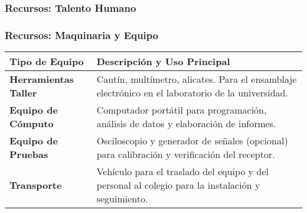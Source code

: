 \begin{frame}
  \frametitle{Recursos: Talento Humano}

\end{frame}

\begin{frame}
  \frametitle{Recursos: Maquinaria y Equipo}

  \begin{tabularx}{\textwidth}{lX}
    \toprule
    \textbf{Tipo de Equipo} & \textbf{Descripción y Uso Principal} \\
    \midrule
    \textbf{Herramientas Taller} & 
    Cautín, multímetro, alicates. Para el ensamblaje electrónico en el 
    laboratorio de la universidad. \\
    \addlinespace
    \textbf{Equipo de Cómputo} & 
    Computador portátil para programación, análisis de datos y elaboración 
    de informes. \\
    \addlinespace
    \textbf{Equipo de Pruebas} & 
    Osciloscopio y generador de señales (opcional) para calibración y 
    verificación del receptor. \\
    \addlinespace
    \textbf{Transporte} & 
    Vehículo para el traslado del equipo y del personal al colegio para la 
    instalación y seguimiento. \\
    \bottomrule
  \end{tabularx}
\end{frame}
